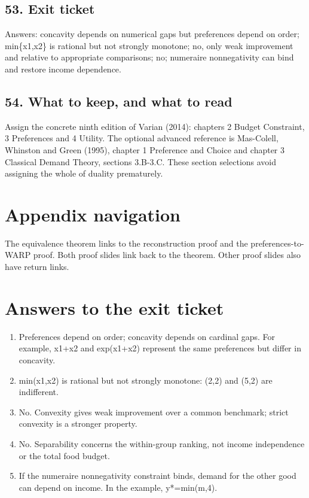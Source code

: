 \documentclass[11pt,a4paper]{article}
\begin{document}
\subsection*{53. Exit ticket}
Answers: concavity depends on numerical gaps but preferences depend on order; min\{x1,x2\} is rational but not strongly monotone; no, only weak improvement and relative to appropriate comparisons; no; numeraire nonnegativity can bind and restore income dependence.

\subsection*{54. What to keep, and what to read}
Assign the concrete ninth edition of Varian (2014): chapters 2 Budget Constraint, 3 Preferences and 4 Utility. The optional advanced reference is Mas-Colell, Whinston and Green (1995), chapter 1 Preference and Choice and chapter 3 Classical Demand Theory, sections 3.B-3.C. These section selections avoid assigning the whole of duality prematurely.

\section*{Appendix navigation}
The equivalence theorem links to the reconstruction proof and the preferences-to-WARP proof. Both proof slides link back to the theorem. Other proof slides also have return links.

\section*{Answers to the exit ticket}
\begin{enumerate}
\item Preferences depend on order; concavity depends on cardinal gaps. For example, x1+x2 and exp(x1+x2) represent the same preferences but differ in concavity.
\item min(x1,x2) is rational but not strongly monotone: (2,2) and (5,2) are indifferent.
\item No. Convexity gives weak improvement over a common benchmark; strict convexity is a stronger property.
\item No. Separability concerns the within-group ranking, not income independence or the total food budget.
\item If the numeraire nonnegativity constraint binds, demand for the other good can depend on income. In the example, y*=min(m,4).
\end{enumerate}
\end{document}
